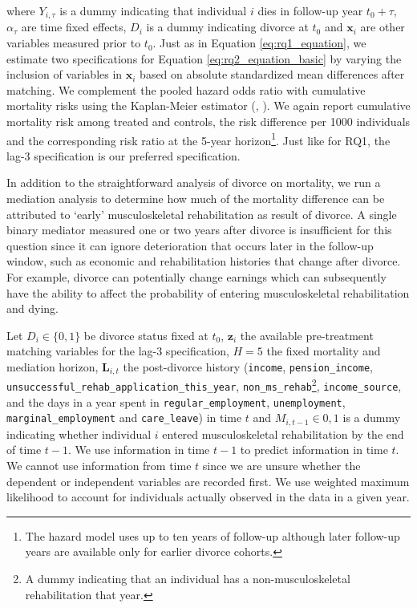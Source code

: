 \documentclass[a4paper,12pt]{article}
\theoremstyle{plain}
\theoremstyle{definition}
\theoremstyle{TheoremNum}
\theoremstyle{CorollaryNum}
\theoremstyle{PropositionNum}
\theoremstyle{TheoremNum}
\begin{document}
where $Y_{i,\tau}$ is a dummy indicating that individual $i$ dies in follow-up year $t_0+\tau$, $\alpha_\tau$ are time fixed effects, $D_i$ is a dummy indicating divorce at $t_0$ and $\mathbf{x}_i$ are other variables measured prior to $t_0$. Just as in Equation \ref{eq:rq1_equation}, we estimate two specifications for Equation \ref{eq:rq2_equation_basic} by varying the inclusion of variables in  $\mathbf{x}_i$ based on absolute standardized mean differences after matching. We complement the pooled hazard odds ratio with cumulative mortality risks using the Kaplan-Meier estimator (\citeauthor{kaplan1958nonparametric}, \citeyear{kaplan1958nonparametric}). We again report cumulative mortality risk among treated and controls, the risk difference per 1000 individuals and the corresponding risk ratio at the 5-year horizon\footnote{The hazard model uses up to ten years of follow-up although later follow-up years are available only for earlier divorce cohorts.}. Just like for RQ1, the lag-3 specification is our preferred specification.

In addition to the straightforward analysis of divorce on mortality, we run a mediation analysis to determine how much of the mortality difference can be attributed to `early' musculoskeletal rehabilitation as result of divorce. A single binary mediator measured one or two years after divorce is insufficient for this question since it can ignore deterioration that occurs later in the follow-up window, such as economic and rehabilitation histories that change after divorce. For example, divorce can potentially change earnings which can subsequently have the ability to affect the probability of entering musculoskeletal rehabilitation and dying. 

Let $D_i \in \{0,1\}$ be divorce status fixed at $t_0$, $\mathbf{z}_i$ the available pre-treatment matching variables for the lag-3 specification, $H=5$ the fixed mortality and mediation horizon, $\mathbf{L}_{i,t}$ the post-divorce history (\texttt{income}, \texttt{pension\_income}, \texttt{unsuccessful\_rehab\_application\_this\_year}, \texttt{non\_ms\_rehab}\footnote{A dummy indicating that an individual has a non-musculoskeletal rehabilitation that year.}, \texttt{income\_source}, and the days in a year spent in \texttt{regular\_employment}, \texttt{unemployment}, \texttt{marginal\_employment} and \texttt{care\_leave}) in time $t$ and $M_{i,t-1} \in {0,1}$ is a dummy indicating whether individual $i$ entered musculoskeletal rehabilitation by the end of time $t-1$. We use information in time $t-1$ to predict information in time $t$. We cannot use information from time $t$ since we are unsure whether the dependent or independent variables are recorded first. We use weighted maximum likelihood to account for individuals actually observed in the data in a given year. 
\end{document}
